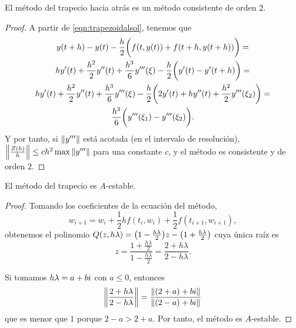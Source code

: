 \begin{proposition}
    El método del trapecio hacia atrás es un método consistente de orden $2$.
\end{proposition}

\begin{proof}
    A partir de \eqref{eqn:trapezoidalsol}, tenemos que 
    \begin{multline*}
        y(t+h) - y(t) - \frac{h}{2}\qty\bigg(f(t, y(t)) + f(t+h, y(t+h))) = \\
        hy'(t) + \frac{h^2}{2}y''(t) + \frac{h^3}{6}y'''(\xi)
        - \frac{h}{2}\qty\bigg(y'(t) - y'(t+h)) = \\
        hy'(t) + \frac{h^2}{2}y''(t) + \frac{h^3}{6}y'''(\xi)
        - \frac{h}{2}\qty\bigg(2y'(t) + hy''(t) + \frac{h^2}{2}y'''(\xi_2)) = \\
        \frac{h^3}{6}\qty\bigg(y'''(\xi_1) - y'''(\xi_2)).
    \end{multline*}
    Y por tanto, si $\norm{y'''}$ está acotada (en el intervalo de resolución),
    $\norm{\frac{Z(h)}{h}} \le ch^2\max{\norm{y'''}}$
    para una constante $c$,
    y el método es consistente y de orden $2$.
\end{proof}

\begin{proposition}
    El método del trapecio es $A$-estable.
\end{proposition}

\begin{proof}
    Tomando los coeficientes de la ecuación del método,
    \begin{equation*}
        w_{i+1} = w_i + \frac{1}{2}hf(t_i, w_i) + \frac{1}{2}f(t_{i+1}, w_{i+1}),
    \end{equation*}
    obtenemos el polinomio
    $Q(z, h\lambda) = \qty(1 - \frac{h\lambda}{2})z - \qty(1 + \frac{h\lambda}{2})$
    cuya única raíz es
    \begin{equation*}
        z = \frac{1 + \frac{h\lambda}{2}}{1 - \frac{h\lambda}{2}} =
        \frac{2 + h\lambda}{2 - h\lambda}.
    \end{equation*}

    Si tomamos $h\lambda = a + bi$ con $a \le 0$, entonces
    \begin{equation*}
        \norm{\frac{2 + h\lambda}{2 - h\lambda}} =
        \frac{\norm{(2+a) + bi}}{\norm{(2-a) + bi}}
    \end{equation*}
    que es menor que $1$ porque $2 - a > 2 + a$.
    Por tanto, el método es $A$-estable.
\end{proof}


